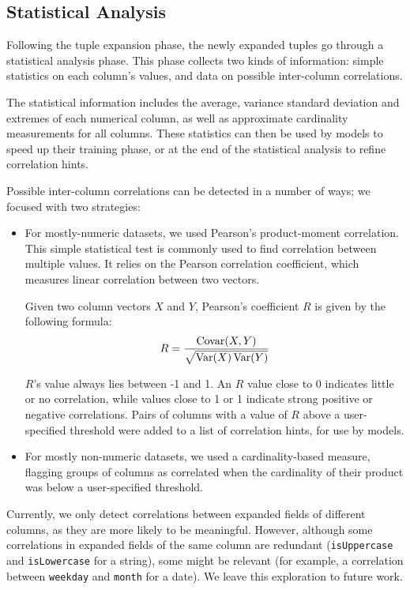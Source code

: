 \subsection{Statistical Analysis}
\label{sec:statistical-analysis}

Following the tuple expansion phase, the newly expanded tuples go through a statistical analysis phase. This phase collects two kinds of information: simple statistics on each column's values, and data on possible inter-column correlations.

The statistical information includes the average, variance standard deviation and extremes of each numerical column, as well as approximate cardinality measurements for all columns. These statistics can then be used by models to speed up their training phase, or at the end of the statistical analysis to refine correlation hints.

Possible inter-column correlations can be detected in a number of ways; we focused with two strategies: 

\begin{itemize}
\item For mostly-numeric datasets, we used Pearson's product-moment
  correlation. This simple statistical test is commonly used to find correlation
  between multiple values. It relies on the Pearson correlation coefficient,
  which measures linear correlation between two vectors.

  Given two column vectors $X$ and $Y$, Pearson's coefficient $R$ is given by the following formula:
  \begin{align} 
    \label{eqn:pearson}
    R = \frac{\operatorname{Covar}(X,Y)}{\sqrt{\operatorname{Var}(X)\operatorname{Var}(Y)}}
  \end{align}
  
  $R$'s value always lies between -1 and 1. An $R$ value close to 0 indicates little or no correlation, while values close to 1 or 1 indicate strong positive or negative correlations. Pairs of columns with a value of \(R\) above a user-specified threshold were added to a list of correlation hints, for use by models. 
\item For mostly non-numeric datasets, we used a cardinality-based measure, flagging groups of columns as correlated when the cardinality of their product was below a user-specified threshold. 
\end{itemize}

Currently, we only detect correlations between expanded fields of different columns, as they are more likely to be meaningful. However, although some correlations in expanded fields of the same column are redundant (\texttt{isUppercase} and \texttt{isLowercase} for a string), some might be relevant (for example, a correlation between \texttt{weekday} and \texttt{month} for a date). We leave this exploration to future work.

